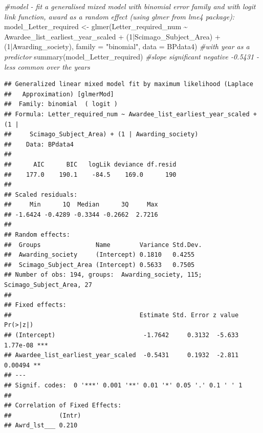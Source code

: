 \documentclass[
]{article}
\newenvironment{Shaded}{\begin{snugshade}}{\end{snugshade}}
\newcommand{\AttributeTok}[1]{\textcolor[rgb]{0.77,0.63,0.00}{#1}}
\newcommand{\CommentTok}[1]{\textcolor[rgb]{0.56,0.35,0.01}{\textit{#1}}}
\newcommand{\DecValTok}[1]{\textcolor[rgb]{0.00,0.00,0.81}{#1}}
\newcommand{\DocumentationTok}[1]{\textcolor[rgb]{0.56,0.35,0.01}{\textbf{\textit{#1}}}}
\newcommand{\FunctionTok}[1]{\textcolor[rgb]{0.00,0.00,0.00}{#1}}
\newcommand{\NormalTok}[1]{#1}
\newcommand{\OtherTok}[1]{\textcolor[rgb]{0.56,0.35,0.01}{#1}}
\newcommand{\SpecialCharTok}[1]{\textcolor[rgb]{0.00,0.00,0.00}{#1}}
\newcommand{\StringTok}[1]{\textcolor[rgb]{0.31,0.60,0.02}{#1}}
\begin{document}
\begin{Shaded}
\begin{Highlighting}[]
\CommentTok{\#model {-} fit a generalised mixed model with binomial error family and with logit link function, award as a random effect (using glmer from lme4 package):}
\NormalTok{model\_Letter\_required }\OtherTok{\textless{}{-}} \FunctionTok{glmer}\NormalTok{(Letter\_required\_num }\SpecialCharTok{\textasciitilde{}}\NormalTok{ Awardee\_list\_earliest\_year\_scaled }\SpecialCharTok{+}\NormalTok{ (}\DecValTok{1}\SpecialCharTok{|}\NormalTok{Scimago\_Subject\_Area) }\SpecialCharTok{+}\NormalTok{ (}\DecValTok{1}\SpecialCharTok{|}\NormalTok{Awarding\_society), }\AttributeTok{family =} \StringTok{"binomial"}\NormalTok{, }\AttributeTok{data =}\NormalTok{ BPdata4) }\CommentTok{\#with year as a predictor}
\FunctionTok{summary}\NormalTok{(model\_Letter\_required) }\CommentTok{\#slope significant negative {-}0.5431 {-} less common over the years}
\end{Highlighting}
\end{Shaded}

\begin{verbatim}
## Generalized linear mixed model fit by maximum likelihood (Laplace
##   Approximation) [glmerMod]
##  Family: binomial  ( logit )
## Formula: Letter_required_num ~ Awardee_list_earliest_year_scaled + (1 |  
##     Scimago_Subject_Area) + (1 | Awarding_society)
##    Data: BPdata4
## 
##      AIC      BIC   logLik deviance df.resid 
##    177.0    190.1    -84.5    169.0      190 
## 
## Scaled residuals: 
##     Min      1Q  Median      3Q     Max 
## -1.6424 -0.4289 -0.3344 -0.2662  2.7216 
## 
## Random effects:
##  Groups               Name        Variance Std.Dev.
##  Awarding_society     (Intercept) 0.1810   0.4255  
##  Scimago_Subject_Area (Intercept) 0.5633   0.7505  
## Number of obs: 194, groups:  Awarding_society, 115; Scimago_Subject_Area, 27
## 
## Fixed effects:
##                                   Estimate Std. Error z value Pr(>|z|)    
## (Intercept)                        -1.7642     0.3132  -5.633 1.77e-08 ***
## Awardee_list_earliest_year_scaled  -0.5431     0.1932  -2.811  0.00494 ** 
## ---
## Signif. codes:  0 '***' 0.001 '**' 0.01 '*' 0.05 '.' 0.1 ' ' 1
## 
## Correlation of Fixed Effects:
##             (Intr)
## Awrd_lst___ 0.210
\end{verbatim}

\begin{Shaded}
\end{Shaded}
\end{document}
